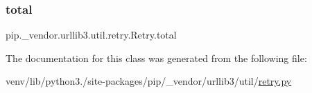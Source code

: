 \subsubsection{\texorpdfstring{total}{total}}
{\footnotesize\ttfamily pip.\+\_\+vendor.\+urllib3.\+util.\+retry.\+Retry.\+total}



The documentation for this class was generated from the following file\+:\begin{DoxyCompactItemize}
\item 
venv/lib/python3./site-\/packages/pip/\+\_\+vendor/urllib3/util/\hyperlink{urllib3_2util_2retry_8py}{retry.\+py}\end{DoxyCompactItemize}
